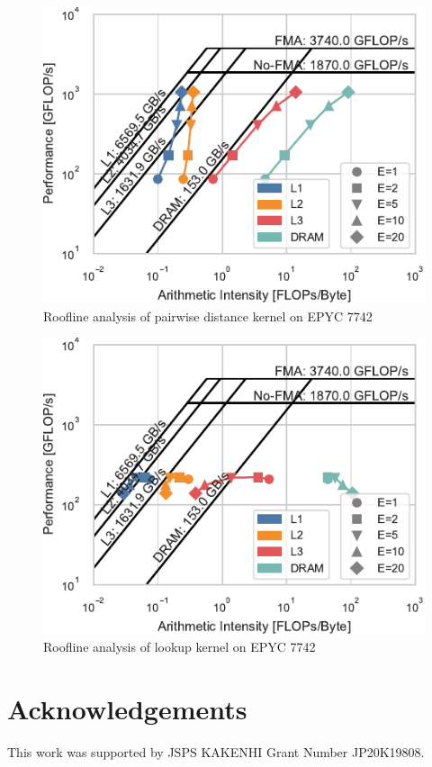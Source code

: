 \documentclass[conference]{IEEEtran}
\begin{document}
\begin{figure}
    \centering
    \includegraphics{figs/roofline_distances_epyc}
    \caption{Roofline analysis of pairwise distance kernel on EPYC 7742}%
    \label{fig:architecture}
\end{figure}

\begin{figure}
    \centering
    \includegraphics{figs/roofline_lookup_epyc}
    \caption{Roofline analysis of lookup kernel on EPYC 7742}%
    \label{fig:architecture}
\end{figure}



\section*{Acknowledgements}
This work was supported by JSPS KAKENHI Grant Number JP20K19808.
\end{document}
